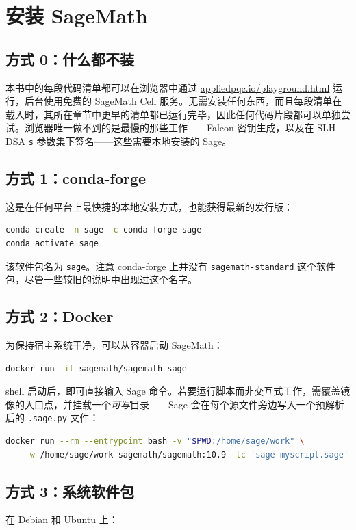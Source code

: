 \section{安装 SageMath}

\subsection{方式 0：什么都不装}
本书中的每段代码清单都可以在浏览器中通过
\href{\playgroundurl}{appliedpqc.io/playground.html} 运行，后台使用免费的 SageMath Cell
服务。无需安装任何东西，而且每段清单在载入时，其所在章节中更早的清单都已运行完毕，因此任何代码片段都可以单独尝试。浏览器唯一做不到的是最慢的那些工作——Falcon 密钥生成，以及在 SLH-DSA \texttt{s} 参数集下签名——这些需要本地安装的 Sage。

\subsection{方式 1：conda-forge}
这是在任何平台上最快捷的本地安装方式，也能获得最新的发行版：

\begin{lstlisting}[language=bash]
conda create -n sage -c conda-forge sage
conda activate sage
\end{lstlisting}

该软件包名为 \texttt{sage}。注意 conda-forge 上并没有 \texttt{sagemath-standard} 这个软件包，尽管一些较旧的说明中出现过这个名字。

\subsection{方式 2：Docker}
为保持宿主系统干净，可以从容器启动 SageMath：

\begin{lstlisting}[language=bash]
docker run -it sagemath/sagemath sage
\end{lstlisting}

shell 启动后，即可直接输入 Sage 命令。若要运行脚本而非交互式工作，需覆盖镜像的入口点，并挂载一个\emph{可写}目录——Sage 会在每个源文件旁边写入一个预解析后的 \texttt{.sage.py} 文件：

\begin{lstlisting}[language=bash]
docker run --rm --entrypoint bash -v "$PWD:/home/sage/work" \
    -w /home/sage/work sagemath/sagemath:10.9 -lc 'sage myscript.sage'
\end{lstlisting}

\subsection{方式 3：系统软件包}
在 Debian 和 Ubuntu 上：

